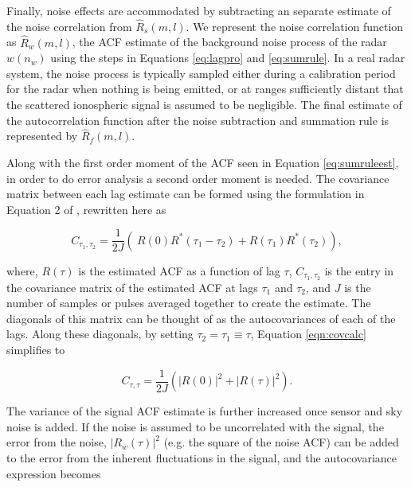 
Finally, noise effects are accommodated by subtracting an separate estimate of the noise correlation from $\widehat{R}_s(m,l)$.  We represent the noise correlation function as $\widehat{R}_w(m,l)$, the ACF estimate of the background noise process of the radar $w(n_w)$ using the steps in Equations \ref{eq:lagpro} and \ref{eq:sumrule}. In a real radar system, the noise process is typically sampled either during a calibration period for the radar when nothing is being emitted, or at ranges sufficiently distant that the scattered ionospheric signal is assumed to be negligible. The final estimate of the autocorrelation function after the noise subtraction and summation rule is represented by $\widehat{R}_f(m,l)$.

Along with the first order moment of the ACF seen in Equation \ref{eq:sumruleest}, in order to do error analysis a second order moment is needed. The covariance matrix between each lag estimate can be formed using the formulation in Equation 2 of \citep{hysell2008}, rewritten here as

\begin{equation}
\label{eqn:covcalc}
C_{\tau_1,\tau_2} = \frac{1}{2J} \left( \ R(0)  R^*(\tau_1-\tau_2) +  R(\tau_1) R^*(\tau_2) \right),
\end{equation}

\noindent where, $R(\tau)$ is the estimated ACF as a function of lag $\tau$, $C_{\tau_1,\tau_2}$ is the entry in the covariance matrix of the estimated ACF at lags $\tau_1$ and $\tau_2$,  and $J$ is the number of samples or pulses averaged together to create the estimate. The diagonals of this matrix can be thought of as the autocovariances of each of the lags.  Along these diagonals, by setting $\tau_2 = \tau_1 \equiv \tau$, Equation \ref{eqn:covcalc} simplifies to

\begin{equation}
\label{eqn:covdiag}
C_{\tau,\tau} = \frac{1}{2J} \left(  |R(0)|^2 +|R(\tau)|^2\right).
\end{equation}

The variance of the signal ACF estimate is further increased once sensor and sky noise is added.  If the noise is assumed to be uncorrelated with the signal, the error from the noise, $\left|R_w (\tau)\right|^2$ (e.g. the square of the noise ACF) can be added to the error from the inherent fluctuations in the signal, and the autocovariance expression becomes

